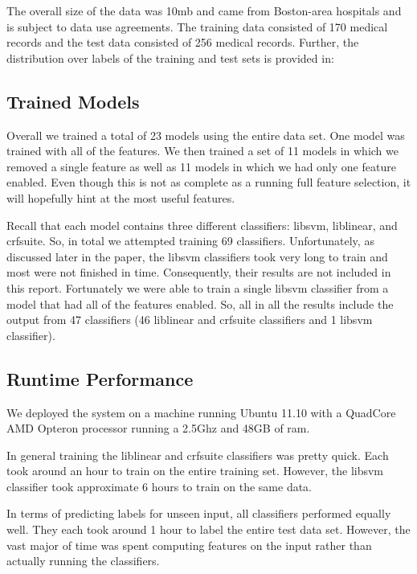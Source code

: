 \documentclass[preprint]{style}
\begin{document}
The overall size of the data was 10mb and came from Boston-area hospitals and is subject to data use agreements. The training data consisted of 170 medical records and the test data consisted of 256 medical records. Further, the distribution over labels of the training and test sets is provided in:



\subsection{Trained Models}

Overall we trained a total of 23 models using the entire data set. One model was trained with all of the features. We then trained a set of 11 models in which we removed a single feature as well as 11 models in which we had only one feature enabled. Even  though this is not as complete as a running full feature selection, it will hopefully hint at the most useful features.

Recall that each model contains three different classifiers: libsvm, liblinear, and crfsuite. So, in total we attempted training 69 classifiers. Unfortunately, as discussed later in the paper, the libsvm classifiers took very long to train and most were not finished in time. Consequently, their results are not included in this report. Fortunately we were able to train a single libsvm classifier from a model that had all of the features enabled.  So, all in all the results include the output from 47 classifiers (46 liblinear and crfsuite classifiers and 1 libsvm classifier).

\subsection{Runtime Performance}

We deployed the system on a machine running Ubuntu 11.10 with a QuadCore AMD Opteron processor running a 2.5Ghz and 48GB of ram.

In general training the liblinear and crfsuite classifiers was pretty quick. Each took around an hour to train on the entire training set. However, the libsvm classifier took approximate 6 hours to train on the same data.

In terms of predicting labels for unseen input, all classifiers performed equally well. They each took around 1 hour to label the entire test data set. However, the vast major of time was spent computing features on the input rather than actually running the classifiers.
\end{document}
